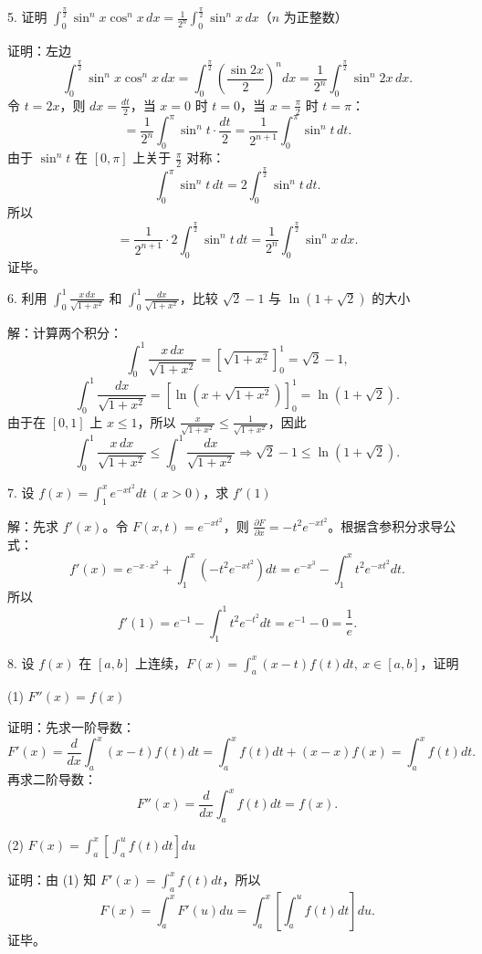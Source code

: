 5. 证明 \(\int_{0}^{\frac{\pi}{2}}\sin^{n}x\cos^{n}x\,dx=\frac{1}{2^{n}}\int_{0}^{\frac{\pi}{2}}\sin^{n}x\,dx\)（\(n\) 为正整数）

证明：左边
\[ \int_{0}^{\frac{\pi}{2}}\sin^{n}x\cos^{n}x\,dx=\int_{0}^{\frac{\pi}{2}}\left(\frac{\sin2x}{2}\right)^{n}dx=\frac{1}{2^{n}}\int_{0}^{\frac{\pi}{2}}\sin^{n}2x\,dx. \]
令 \(t=2x\)，则 \(dx=\frac{dt}{2}\)，当 \(x=0\) 时 \(t=0\)，当 \(x=\frac{\pi}{2}\) 时 \(t=\pi\)：
\[ =\frac{1}{2^{n}}\int_{0}^{\pi}\sin^{n}t\cdot\frac{dt}{2}=\frac{1}{2^{n+1}}\int_{0}^{\pi}\sin^{n}t\,dt. \]
由于 \(\sin^{n}t\) 在 \([0,\pi]\) 上关于 \(\frac{\pi}{2}\) 对称：
\[ \int_{0}^{\pi}\sin^{n}t\,dt=2\int_{0}^{\frac{\pi}{2}}\sin^{n}t\,dt. \]
所以
\[ =\frac{1}{2^{n+1}}\cdot2\int_{0}^{\frac{\pi}{2}}\sin^{n}t\,dt=\frac{1}{2^{n}}\int_{0}^{\frac{\pi}{2}}\sin^{n}x\,dx. \]
证毕。

6. 利用 \(\int_{0}^{1}\frac{x\,dx}{\sqrt{1+x^{2}}}\) 和 \(\int_{0}^{1}\frac{dx}{\sqrt{1+x^{2}}}\)，比较 \(\sqrt2-1\) 与 \(\ln(1+\sqrt2)\) 的大小

解：计算两个积分：
\[ \int_{0}^{1}\frac{x\,dx}{\sqrt{1+x^{2}}}=\left[\sqrt{1+x^{2}}\right]_{0}^{1}=\sqrt2-1, \]
\[ \int_{0}^{1}\frac{dx}{\sqrt{1+x^{2}}}=\left[\ln\left(x+\sqrt{1+x^{2}}\right)\right]_{0}^{1}=\ln(1+\sqrt2). \]
由于在 \([0,1]\) 上 \(x\le1\)，所以 \(\frac{x}{\sqrt{1+x^{2}}}\le\frac{1}{\sqrt{1+x^{2}}}\)，因此
\[ \int_{0}^{1}\frac{x\,dx}{\sqrt{1+x^{2}}}\le\int_{0}^{1}\frac{dx}{\sqrt{1+x^{2}}}\Rightarrow\sqrt2-1\le\ln(1+\sqrt2). \]

7. 设 \(f(x)=\int_{1}^{x}e^{-xt^{2}}dt\ (x>0)\)，求 \(f'(1)\)

解：先求 \(f'(x)\)。令 \(F(x,t)=e^{-xt^{2}}\)，则 \(\frac{\partial F}{\partial x}=-t^{2}e^{-xt^{2}}\)。根据含参积分求导公式：
\[ f'(x)=e^{-x\cdot x^{2}}+\int_{1}^{x}(-t^{2}e^{-xt^{2}})dt=e^{-x^{3}}-\int_{1}^{x}t^{2}e^{-xt^{2}}dt. \]
所以
\[ f'(1)=e^{-1}-\int_{1}^{1}t^{2}e^{-t^{2}}dt=e^{-1}-0=\frac{1}{e}. \]

8. 设 \(f(x)\) 在 \([a,b]\) 上连续，\(F(x)=\int_{a}^{x}(x-t)f(t)dt,\ x\in[a,b]\)，证明

(1) \(F''(x)=f(x)\)

证明：先求一阶导数：
\[ F'(x)=\frac{d}{dx}\int_{a}^{x}(x-t)f(t)dt=\int_{a}^{x}f(t)dt+(x-x)f(x)=\int_{a}^{x}f(t)dt. \]
再求二阶导数：
\[ F''(x)=\frac{d}{dx}\int_{a}^{x}f(t)dt=f(x). \]

(2) \(F(x)=\int_{a}^{x}\left[\int_{a}^{u}f(t)dt\right]du\)

证明：由 (1) 知 \(F'(x)=\int_{a}^{x}f(t)dt\)，所以
\[ F(x)=\int_{a}^{x}F'(u)du=\int_{a}^{x}\left[\int_{a}^{u}f(t)dt\right]du. \]
证毕。

